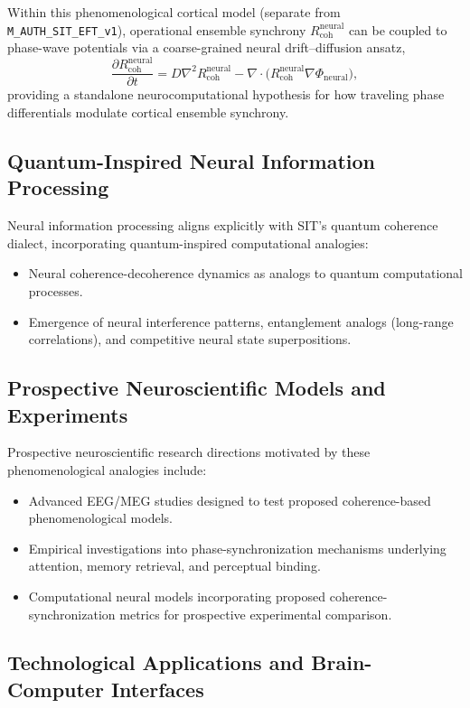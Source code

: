 Within this phenomenological cortical model (separate from \texttt{M\_AUTH\_SIT\_EFT\_v1}), operational ensemble synchrony $R_{\mathrm{coh}}^{\mathrm{neural}}$ can be coupled to phase-wave potentials via a coarse-grained neural drift--diffusion ansatz,
\[
\frac{\partial R_{\mathrm{coh}}^{\mathrm{neural}}}{\partial t} = D \nabla^2 R_{\mathrm{coh}}^{\mathrm{neural}} - \nabla \cdot \bigl(R_{\mathrm{coh}}^{\mathrm{neural}} \nabla \Phi_{\mathrm{neural}}\bigr),
\]
providing a standalone neurocomputational hypothesis for how traveling phase differentials modulate cortical ensemble synchrony.

\subsection{Quantum-Inspired Neural Information Processing}

Neural information processing aligns explicitly with SIT's quantum coherence dialect, incorporating quantum-inspired computational analogies:

\begin{itemize}
\item Neural coherence-decoherence dynamics as analogs to quantum computational processes.
\item Emergence of neural interference patterns, entanglement analogs (long-range correlations), and competitive neural state superpositions.
\end{itemize}

\subsection{Prospective Neuroscientific Models and Experiments}

Prospective neuroscientific research directions motivated by these phenomenological analogies include:

\begin{itemize}
\item Advanced EEG/MEG studies designed to test proposed coherence-based phenomenological models.
\item Empirical investigations into phase-synchronization mechanisms underlying attention, memory retrieval, and perceptual binding.
\item Computational neural models incorporating proposed coherence-synchronization metrics for prospective experimental comparison.
\end{itemize}

\subsection{Technological Applications and Brain-Computer Interfaces}

